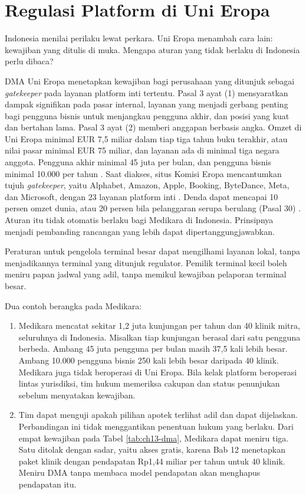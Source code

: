 \section{Regulasi Platform di Uni Eropa}

Indonesia menilai perilaku lewat perkara. Uni Eropa menambah cara lain: kewajiban yang ditulis di muka. Mengapa aturan yang tidak berlaku di Indonesia perlu dibaca?

DMA Uni Eropa menetapkan kewajiban bagi perusahaan yang ditunjuk sebagai \textit{gatekeeper} pada layanan platform inti tertentu. Pasal 3 ayat (1) mensyaratkan dampak signifikan pada pasar internal, layanan yang menjadi gerbang penting bagi pengguna bisnis untuk menjangkau pengguna akhir, dan
posisi yang kuat dan bertahan lama. Pasal 3 ayat (2) memberi anggapan berbasis angka. Omzet di Uni Eropa minimal EUR 7,5 miliar dalam tiap tiga tahun buku terakhir, atau nilai pasar minimal EUR 75 miliar, dan layanan ada di minimal tiga negara anggota. Pengguna akhir minimal 45 juta per bulan, dan
pengguna bisnis minimal 10.000 per tahun \cite{eu-dma-2022}. Saat diakses, situs Komisi Eropa mencantumkan tujuh \textit{gatekeeper}, yaitu Alphabet, Amazon, Apple, Booking, ByteDance, Meta, dan Microsoft, dengan 23 layanan platform inti \cite{c13-ec-gatekeepers}. Denda dapat mencapai 10 persen omzet dunia, atau 20 persen bila
pelanggaran serupa berulang (Pasal 30) \cite{eu-dma-2022}. Aturan itu tidak otomatis berlaku bagi Medikara di Indonesia. Prinsipnya menjadi pembanding rancangan yang lebih dapat dipertanggungjawabkan.

Peraturan untuk pengelola terminal besar dapat mengilhami layanan lokal, tanpa menjadikannya terminal yang ditunjuk regulator. Pemilik terminal kecil boleh meniru papan jadwal yang adil, tanpa memikul kewajiban pelaporan terminal besar.

Dua contoh berangka pada Medikara:
\begin{enumerate}
  \item Medikara mencatat sekitar 1,2 juta kunjungan per tahun dan 40 klinik mitra, seluruhnya di Indonesia. Misalkan tiap kunjungan berasal dari satu pengguna berbeda. Ambang 45 juta pengguna per bulan masih 37,5 kali lebih besar. Ambang 10.000 pengguna bisnis 250 kali lebih besar daripada 40 klinik. Medikara
        juga tidak beroperasi di Uni Eropa. Bila kelak platform beroperasi lintas yurisdiksi, tim hukum memeriksa cakupan dan status penunjukan sebelum menyatakan kewajiban.
  \item Tim dapat menguji apakah pilihan apotek terlihat adil dan dapat dijelaskan. Perbandingan ini tidak menggantikan penentuan hukum yang berlaku. Dari empat kewajiban pada Tabel \ref{tab:ch13-dma}, Medikara dapat meniru tiga. Satu ditolak dengan sadar, yaitu akses gratis, karena Bab 12 menetapkan paket
        klinik dengan pendapatan Rp1,44 miliar per tahun untuk 40 klinik. Meniru DMA tanpa membaca model pendapatan akan menghapus pendapatan itu.
\end{enumerate}

